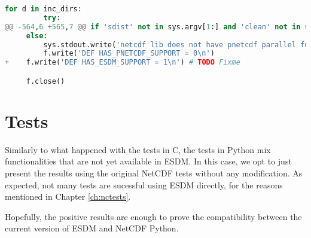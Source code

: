 \begin{lstlisting}[language=python,upquote=true]
     for d in inc_dirs:
         try:
@@ -564,6 +565,7 @@ if 'sdist' not in sys.argv[1:] and 'clean' not in sys.argv[1:]:
     else:
         sys.stdout.write('netcdf lib does not have pnetcdf parallel functions\n')
         f.write('DEF HAS_PNETCDF_SUPPORT = 0\n')
+    f.write('DEF HAS_ESDM_SUPPORT = 1\n') # TODO Fixme

     f.close()
\end{lstlisting}

\section{Tests}

Similarly to what happened with the tests in C, the tests in Python mix functionalities that are not yet available in ESDM. In this case, we opt to just present the results using the original NetCDF tests without any modification. As expected, not many tests are sucessful using ESDM directly, for the reasons mentioned in Chapter \ref{ch:nctests}.

Hopefully, the positive results are enough to prove the compatibility between the current version of ESDM and NetCDF Python.

